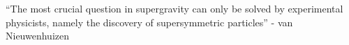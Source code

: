 “The most crucial question in supergravity can only be solved by experimental physicists, namely the discovery of supersymmetric particles” - van Nieuwenhuizen